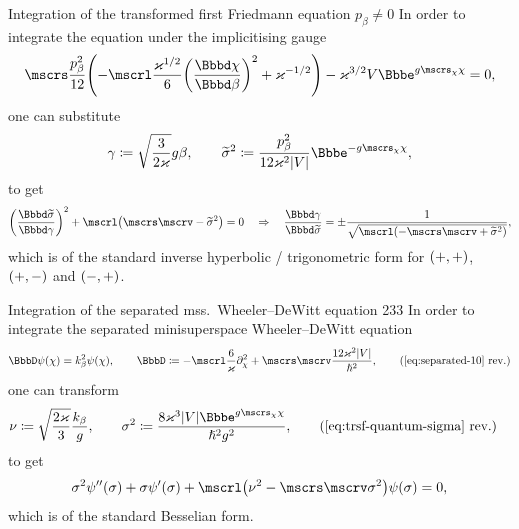 \documentclass[9pt]{beamer}
\begin{document}
\begin{frame}%
{Integration of the transformed first Friedmann equation}%
{$p_\beta \neq 0$}
In order to integrate the equation under the implicitising gauge
\begin{align}
\mscrs\frac{p_\beta^2}{12}\rbr{
-\mscrl\frac{\varkappa^{1/2}}{6}\rbr{\frde{\chi}{\beta}}^2
+\varkappa^{-1/2}}
-\varkappa^{3/2}V\ee^{g\mscrs_\chi\chi} = 0,
\end{align}
one can substitute
\begin{align}
\gamma \coloneqq \sqrt{\frac{3}{2\varkappa}}g\beta, \qquad
\widetilde{\sigma}^2 \coloneqq \frac{p_\beta^2}{12\varkappa^2 \vbr{V}}
\ee^{-g\mscrs_\chi\chi},
\end{align}
to get
\begin{align}
\rbr{\frde{\widetilde{\sigma}}{\gamma}}^2
+\mscrl\rbr{\mscrs\mscrv - \widetilde{\sigma}^2} = 0
\quad\Rightarrow\quad
\frde{\gamma}{\widetilde{\sigma}} = \pm
\frac{1}{\sqrt{\mscrl\rbr{- \mscrs\mscrv + \widetilde{\sigma}^2}}},
\end{align}
which is of the standard inverse hyperbolic / trigonometric form for
${\left(+,+\right)}$, ${\left(+,-\right)}$ and ${\left(-,+\right)}$.
\end{frame}



\begin{frame}%
{Integration of the separated mss.\ Wheeler--DeWitt equation}%
{233}
In order to integrate the separated minisuperspace Wheeler--DeWitt equation
\begin{align}
\BbbD \rfun{\psi}{\chi} = k_\beta^2 \rfun{\psi}{\chi},\qquad
\BbbD \coloneqq
-\mscrl \frac{6}{\varkappa} \partial_\chi^2
+ \mscrs\mscrv \frac{12\varkappa^2\vbr{V}}{\hslash^2},
\tag{\ref{eq:separated-10} rev.}
\end{align}
one can transform
\begin{align}
\nu &\coloneqq \sqrt{\frac{2\varkappa}{3}}\frac{k_\beta}{g},\qquad
\sigma^2 \coloneqq 
\frac{8\varkappa^3\vbr{V}\ee^{g\mscrs_\chi\chi}}{\hslash^2 g^2},
\tag{\ref{eq:trsf-quantum-sigma} rev.}
\end{align}
to get
\begin{align}
\sigma^2\rfun{\psi''}{\sigma}
+\sigma\rfun{\psi'}{\sigma}
+\mscrl\rbr{\nu^2-\mscrs\mscrv\sigma^2}\rfun{\psi}{\sigma} = 0,
\end{align}
which is of the standard Besselian form.
\end{frame}
\end{document}
